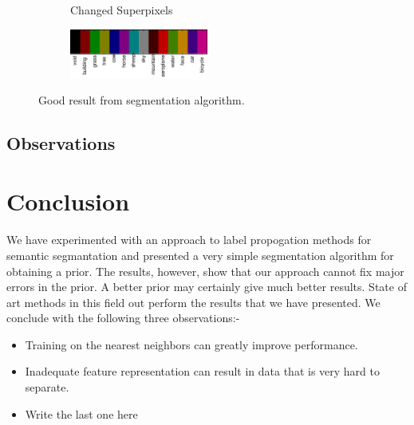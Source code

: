 \documentclass{article} %
\begin{document}
\begin{figure}[htb]
\begin{subfigure}[t]{0.33\textwidth}
		\parbox{0.95\textwidth}{\caption{Changed Superpixels \label{fig:changed_good}}}
	\end{subfigure}

	\begin{subfigure}[t]{\textwidth}
		\centering
		\includegraphics[width = 0.5\textwidth]{./img/legend-rot.png}
	\end{subfigure}
	\caption{Good result from segmentation algorithm.}
	\label{fig:result_good}
\end{figure}

\subsection{Observations}

\label{sec:Observations}


\section{Conclusion}
\label{sec:Conclusion}
We have experimented with an approach to label propogation methods for semantic segmantation and presented a very simple segmentation algorithm for obtaining a prior. The results, however, show that our approach cannot fix major errors in the prior. A better prior may certainly give much better results. State of art methods in this field out perform the results that we have presented. We conclude with the following three observations:-
\begin{itemize}
\item Training on the nearest neighbors can greatly improve performance.
\item Inadequate feature representation can result in data that is very hard to separate.
\item Write the last one here
\end{itemize}



\end{document}
